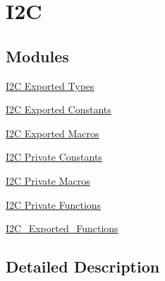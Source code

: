 \hypertarget{group___i2_c}{}\section{I2C}
\label{group___i2_c}
\subsection*{Modules}
\begin{DoxyCompactItemize}
\item 
\hyperlink{group___i2_c___exported___types}{I2\+C Exported Types}
\item 
\hyperlink{group___i2_c___exported___constants}{I2\+C Exported Constants}
\item 
\hyperlink{group___i2_c___exported___macros}{I2\+C Exported Macros}
\item 
\hyperlink{group___i2_c___private___constants}{I2\+C Private Constants}
\item 
\hyperlink{group___i2_c___private___macros}{I2\+C Private Macros}
\item 
\hyperlink{group___i2_c___private___functions}{I2\+C Private Functions}
\item 
\hyperlink{group___i2_c___exported___functions}{I2\+C\+\_\+\+Exported\+\_\+\+Functions}
\end{DoxyCompactItemize}


\subsection{Detailed Description}
